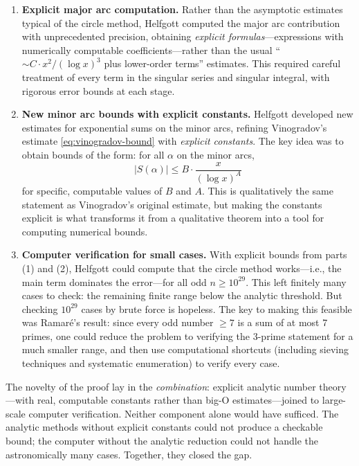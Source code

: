 \begin{enumerate}
\item \textbf{Explicit major arc computation.} Rather than the asymptotic estimates typical of the circle method, Helfgott computed the major arc contribution with unprecedented precision, obtaining \emph{explicit formulas}---expressions with numerically computable coefficients---rather than the usual ``$\sim C \cdot x^2 / (\log x)^3$ plus lower-order terms'' estimates. This required careful treatment of every term in the singular series and singular integral, with rigorous error bounds at each stage.

\item \textbf{New minor arc bounds with explicit constants.} Helfgott developed new estimates for exponential sums on the minor arcs, refining Vinogradov's estimate \eqref{eq:vinogradov-bound} with \emph{explicit constants}. The key idea was to obtain bounds of the form: for all $\alpha$ on the minor arcs,
\[
|S(\alpha)| \leq B \cdot \frac{x}{(\log x)^A}
\]
for specific, computable values of $B$ and $A$. This is qualitatively the same statement as Vinogradov's original estimate, but making the constants explicit is what transforms it from a qualitative theorem into a tool for computing numerical bounds.

\item \textbf{Computer verification for small cases.} With explicit bounds from parts (1) and (2), Helfgott could compute that the circle method works---i.e., the main term dominates the error---for all odd $n \geq 10^{29}$. This left finitely many cases to check: the remaining finite range below the analytic threshold. But checking $10^{29}$ cases by brute force is hopeless. The key to making this feasible was Ramar\'e's result: since every odd number $\geq 7$ is a sum of at most 7 primes, one could reduce the problem to verifying the 3-prime statement for a much smaller range, and then use computational shortcuts (including sieving techniques and systematic enumeration) to verify every case.
\end{enumerate}

The novelty of the proof lay in the \emph{combination}: explicit analytic number theory---with real, computable constants rather than big-O estimates---joined to large-scale computer verification. Neither component alone would have sufficed. The analytic methods without explicit constants could not produce a checkable bound; the computer without the analytic reduction could not handle the astronomically many cases. Together, they closed the gap.

